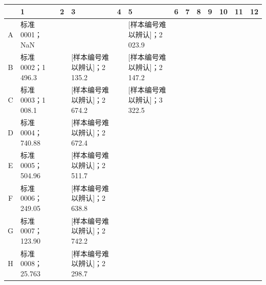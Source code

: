 \documentclass[UTF8,10pt,a4paper,fontset=fandol]{ctexart}
\newcommand{\fieldvalue}[1]{#1}
\begin{document}
\small
\begin{tabular}{c|p{1.05cm}|p{1.05cm}|p{1.05cm}|p{1.05cm}|p{1.05cm}|p{1.05cm}|p{1.05cm}|p{1.05cm}|p{1.05cm}|p{1.05cm}|p{1.05cm}|p{1.05cm}}
 & 1 & 2 & 3 & 4 & 5 & 6 & 7 & 8 & 9 & 10 & 11 & 12\\ \hline
A &
\fieldvalue{标准0001；NaN}
&
&
&
&
\fieldvalue{[样本编号难以辨认]；2\,023.9}
&
&
&
&
&
&
&
\\ \hline
B &
\fieldvalue{标准0002；1\,496.3}
&
&
\fieldvalue{[样本编号难以辨认]；2\,135.2}
&
&
\fieldvalue{[样本编号难以辨认]；2\,147.2}
&
&
&
&
&
&
&
\\ \hline
C &
\fieldvalue{标准0003；1\,008.1}
&
&
\fieldvalue{[样本编号难以辨认]；2\,674.2}
&
&
\fieldvalue{[样本编号难以辨认]；3\,322.5}
&
&
&
&
&
&
&
\\ \hline
D &
\fieldvalue{标准0004；740.88}
&
&
\fieldvalue{[样本编号难以辨认]；2\,672.4}
&
&
&
&
&
&
&
&
&
\\ \hline
E &
\fieldvalue{标准0005；504.96}
&
&
\fieldvalue{[样本编号难以辨认]；2\,511.7}
&
&
&
&
&
&
&
&
&
\\ \hline
F &
\fieldvalue{标准0006；249.05}
&
&
\fieldvalue{[样本编号难以辨认]；2\,638.8}
&
&
&
&
&
&
&
&
&
\\ \hline
G &
\fieldvalue{标准0007；123.90}
&
&
\fieldvalue{[样本编号难以辨认]；2\,742.2}
&
&
&
&
&
&
&
&
&
\\ \hline
H &
\fieldvalue{标准0008；25.763}
&
&
\fieldvalue{[样本编号难以辨认]；2\,298.7}
&
&
&
&
&
&
&
&
&
\\
\end{tabular}
\normalsize
\end{document}
